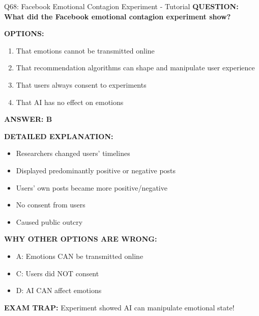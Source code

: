 \documentclass[8pt]{beamer}
\begin{document}
	\begin{frame}{Q68: Facebook Emotional Contagion Experiment - Tutorial}
		\fontsize{6.5}{7.5}\selectfont
		\textbf{QUESTION: What did the Facebook emotional contagion experiment show?}
		
		\vspace{0.1cm}
		\textbf{OPTIONS:}
		\begin{enumerate}
			\item That emotions cannot be transmitted online
			\item That recommendation algorithms can shape and manipulate user experience
			\item That users always consent to experiments
			\item That AI has no effect on emotions
		\end{enumerate}
		
		\vspace{0.1cm}
		\textcolor{myblue}{\textbf{ANSWER: B}}
		
		\vspace{0.1cm}
		\textbf{DETAILED EXPLANATION:}
		\begin{itemize}
			\item Researchers changed users' timelines
			\item Displayed predominantly positive or negative posts
			\item Users' own posts became more positive/negative
			\item No consent from users
			\item Caused public outcry
		\end{itemize}
		
		\vspace{0.1cm}
		\textcolor{myred}{\textbf{WHY OTHER OPTIONS ARE WRONG:}}
		\begin{itemize}
			\item \textcolor{myred}{A:} Emotions CAN be transmitted online
			\item \textcolor{myred}{C:} Users did NOT consent
			\item \textcolor{myred}{D:} AI CAN affect emotions
		\end{itemize}
		
		\textcolor{myred}{\textbf{EXAM TRAP:}} Experiment showed \textcolor{myblue}{AI can manipulate emotional state}!
	\end{frame}
	
\end{document}
